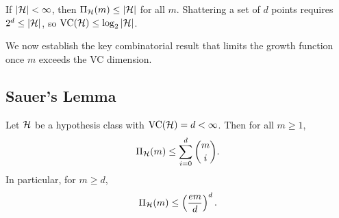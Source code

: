 \documentclass[11pt,a4paper]{article}
\begin{document}
\begin{example}
\label{ex:vc_finite}
If $|\mathcal{H}| < \infty$, then $\Pi_{\mathcal{H}}(m) \leq |\mathcal{H}|$ for
all $m$.  Shattering a set of $d$ points requires
$2^d \leq |\mathcal{H}|$, so $\operatorname{VC}(\mathcal{H}) \leq \log_2 |\mathcal{H}|$.
\end{example}

We now establish the key combinatorial result that limits the growth
function once $m$ exceeds the VC dimension.

\subsection{Sauer's Lemma}

\begin{theorem}
\label{thm:sauer}
Let $\mathcal{H}$ be a hypothesis class with $\operatorname{VC}(\mathcal{H}) = d < \infty$.
Then for all $m \geq 1$,
\[
    \Pi_{\mathcal{H}}(m) \leq \sum_{i=0}^{d} \binom{m}{i}.
\]
In particular, for $m \geq d$,
\[
    \Pi_{\mathcal{H}}(m) \leq \left(\frac{em}{d}\right)^d.
\]
\end{theorem}
\end{document}
